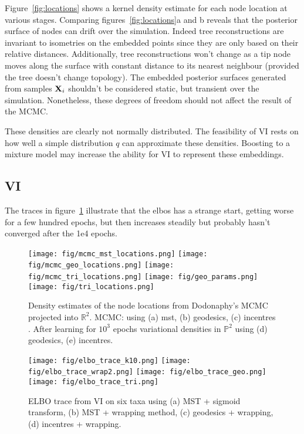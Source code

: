 \documentclass[11pt]{article}
\begin{document}
Figure~\ref{fig:locations} shows a kernel density estimate for each node location at various stages.
Comparing figures~\ref{fig:locations}a and b reveals that the posterior surface of nodes can drift over the simulation.
Indeed tree reconstructions are invariant to isometries on the embedded points since they are only based on their relative distances.
Additionally, tree reconstructions won't change as a tip node moves along the surface with constant distance to its nearest neighbour (provided the tree doesn't change topology).
The embedded posterior surfaces generated from samples $\bold{X}_{i}$ shouldn't be considered static, but transient over the simulation.
Nonetheless, these degrees of freedom should not affect the result of the MCMC.

These densities are clearly not normally distributed.
The feasibility of VI rests on how well a simple distribution $q$ can approximate these densities.
Boosting to a mixture model may increase the ability for VI to represent these embeddings.
	
\subsection{VI}
The traces in figure~\ref{fig:elbos} illustrate that the elbos has a strange start, getting worse for a few hundred epochs, but then increases steadily but probably hasn’t converged after the 1e4 epochs.
\begin{figure}[htbp]
\begin{center}
\texttt{[image: fig/mcmc\_mst\_locations.png]}%
\texttt{[image: fig/mcmc\_geo\_locations.png]}%
\texttt{[image: fig/mcmc\_tri\_locations.png]}
\texttt{[image: fig/geo\_params.png]}%
\texttt{[image: fig/tri\_locations.png]}
\caption{Density estimates of the node locations from Dodonaphy's MCMC projected into $\mathbb{R}^{2}$. MCMC: using (a) mst, (b) geodesics, (c) incentres . After learning for $10^{3}$ epochs variational densities in $\mathbb{P}^{2}$ using (d) geodesics, (e) incentres.
}
\label{fig:elbos}
\end{center}
\end{figure}

\begin{figure}[htbp]
\begin{center}
\texttt{[image: fig/elbo\_trace\_k10.png]}%
\texttt{[image: fig/elbo\_trace\_wrap2.png]}%
\texttt{[image: fig/elbo\_trace\_geo.png]}%
\texttt{[image: fig/elbo\_trace\_tri.png]}
\caption{ELBO trace from VI on six taxa using (a) MST + sigmoid transform, (b) MST + wrapping method, (c) geodesics + wrapping, (d) incentres + wrapping.}
\label{fig:elbo}
\end{center}
\end{figure}
\end{document}
